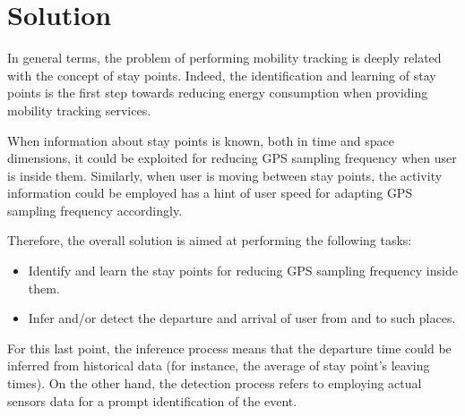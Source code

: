 \documentclass[ENG,PhD]{cinvestav}
\begin{document}
 
%                                                              
\section{Solution}\label{sec:solution}



In general terms, the problem of performing mobility tracking is deeply related with the concept of stay points.
Indeed, the identification and learning of stay points is the first step towards reducing energy consumption when providing mobility tracking services.

When information about stay points is known, both in time and space dimensions, it could be exploited for reducing GPS sampling frequency when user is inside them.
Similarly, when user is moving between stay points, the activity information could be employed has a hint of user speed for adapting GPS sampling frequency accordingly.  

Therefore, the overall solution is aimed at performing the following tasks:
\begin{itemize}
  \item Identify and learn the stay points for reducing GPS sampling frequency inside them.
  \item Infer and/or detect the departure and arrival of user from and to such places.
\end{itemize}

For this last point, the inference process means that the departure time could be inferred from historical data (for instance, the average of stay point's leaving times).
On the other hand, the detection process refers to employing actual sensors data for a prompt identification of the event.
\end{document}
